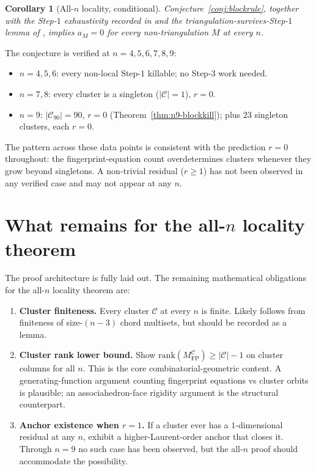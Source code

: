 \documentclass[11pt]{article}
\newtheorem{cor}[thm]{Corollary}
\theoremstyle{definition}
\begin{document}
\begin{cor}[All-$n$ locality, conditional]\label{cor:allnloc}
Conjecture~\ref{conj:blockrule}, together with the Step-$1$
exhaustivity recorded in \cite{step1stats} and the
triangulation-survives-Step-$1$ lemma of \cite{tri-survives},
implies $a_M=0$ for every non-triangulation $M$ at every $n$.
\end{cor}

The conjecture is verified at $n=4,5,6,7,8,9$:
\begin{itemize}[leftmargin=*,topsep=2pt,itemsep=2pt]
\item $n=4,5,6$: every non-local Step-$1$ killable; no Step-$3$ work
needed.
\item $n=7,8$: every cluster is a singleton ($|\mathcal C|=1$),
$r=0$.
\item $n=9$: $|\mathcal C_{90}|=90$, $r=0$
(Theorem~\ref{thm:n9-blockkill}); plus $23$ singleton clusters,
each $r=0$.
\end{itemize}

The pattern across these data points is consistent with the
prediction $r=0$ throughout: the fingerprint-equation count
overdetermines clusters whenever they grow beyond singletons.
A non-trivial residual ($r\ge 1$) has not been observed in any
verified case and may not appear at any $n$.

\section{What remains for the all-$n$ locality theorem}\label{sec:remaining}

The proof architecture is fully laid out. The remaining mathematical
obligations for the all-$n$ locality theorem are:

\begin{enumerate}[leftmargin=*,topsep=2pt,itemsep=2pt]
\item \textbf{Cluster finiteness.} Every cluster $\mathcal C$ at
every $n$ is finite. Likely follows from finiteness of
size-$(n{-}3)$ chord multisets, but should be recorded as a lemma.

\item \textbf{Cluster rank lower bound.} Show
$\mathrm{rank}(M_{\mathrm{FP}}^{\mathcal C})\ge|\mathcal C|-1$ on
cluster columns for all $n$. This is the core combinatorial-geometric
content. A generating-function argument counting fingerprint
equations vs cluster orbits is plausible; an associahedron-face
rigidity argument is the structural counterpart.

\item \textbf{Anchor existence when $r=1$.} If a cluster ever has a
$1$-dimensional residual at any $n$, exhibit a higher-Laurent-order
anchor that closes it. Through $n=9$ no such case has been observed,
but the all-$n$ proof should accommodate the possibility.
\end{enumerate}
\end{document}
